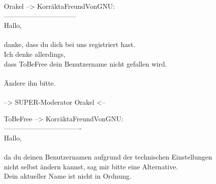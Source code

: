 \noindent \parbox{\textwidth}{

    \begin{footnotesize}
    \begin{itshape}

\noindent Orakel --> KorräktaFreundVonGNU:\\
\noindent --------------------------------\\
\noindent Hallo,\\
\noindent ~\\
\noindent danke, dass du dich bei uns registriert hast.\\
\noindent Ich denke allerdings,\\
\noindent dass ToBeFree dein Benutzername nicht gefallen wird.\\
\noindent ~\\
\noindent Ändere ihn bitte.\\
\noindent ~\\
\noindent --> SUPER-Moderator Orakel <--\\
    \end{itshape}
    \end{footnotesize}

}


\noindent \parbox{\textwidth}{

    \begin{footnotesize}
    \begin{itshape}
    \begin{flushright}

\noindent ToBeFree --> KorräktaFreundVonGNU:\\
\noindent ----------------------------------\\
\noindent Hallo,\\
\noindent ~\\
\noindent da du deinen Benutzernamen aufgrund der technischen Einstellungen\\
\noindent nicht selbst ändern kannst, sag mir bitte eine Alternative.\\
\noindent Dein aktueller Name ist nicht in Ordnung.\\

    \end{flushright}
    \end{itshape}
    \end{footnotesize}

}

